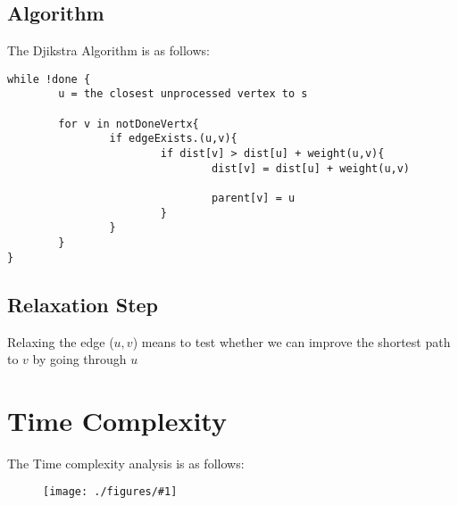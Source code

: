 \documentclass[12pt]{book}
\newcommand{\incimg}[2]{%
       \begin{figure}[h]
               \centering
               \texttt{[image: ./figures/\#1]}
       \end{figure}
}
\begin{document}
\subsection*{Algorithm}
The Djikstra Algorithm is as follows:
\begin{verbatim}
while !done {
        u = the closest unprocessed vertex to s

        for v in notDoneVertx{
                if edgeExists.(u,v){
                        if dist[v] > dist[u] + weight(u,v){
                                dist[v] = dist[u] + weight(u,v)

                                parent[v] = u
                        }
                }
        }
}
\end{verbatim}

\subsection*{Relaxation Step}
Relaxing the edge ($u,v$) means to test whether we can improve the shortest path to $v$ by going through $u$

\section*{Time Complexity}
The Time complexity analysis is as follows:
\incimg{time}{0.3}
\end{document}
